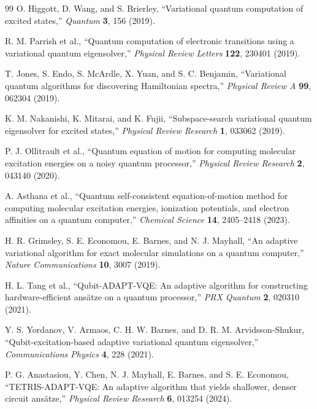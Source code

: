 \documentclass[
  reprint,
  amsmath,
  amssymb,
  aps,
  pra,
  nofootinbib,
  superscriptaddress,
  floatfix
]{revtex4-2}
\begin{document}
\begin{thebibliography}{99}
O. Higgott, D. Wang, and S. Brierley,
``Variational quantum computation of excited states,''
\emph{Quantum} \textbf{3}, 156 (2019).

R. M. Parrish et al.,
``Quantum computation of electronic transitions using a variational quantum eigensolver,''
\emph{Physical Review Letters} \textbf{122}, 230401 (2019).

T. Jones, S. Endo, S. McArdle, X. Yuan, and S. C. Benjamin,
``Variational quantum algorithms for discovering Hamiltonian spectra,''
\emph{Physical Review A} \textbf{99}, 062304 (2019).

K. M. Nakanishi, K. Mitarai, and K. Fujii,
``Subspace-search variational quantum eigensolver for excited states,''
\emph{Physical Review Research} \textbf{1}, 033062 (2019).

P. J. Ollitrault et al.,
``Quantum equation of motion for computing molecular excitation energies on a noisy quantum processor,''
\emph{Physical Review Research} \textbf{2}, 043140 (2020).

A. Asthana et al.,
``Quantum self-consistent equation-of-motion method for computing molecular excitation energies, ionization potentials, and electron affinities on a quantum computer,''
\emph{Chemical Science} \textbf{14}, 2405--2418 (2023).

H. R. Grimsley, S. E. Economou, E. Barnes, and N. J. Mayhall,
``An adaptive variational algorithm for exact molecular simulations on a quantum computer,''
\emph{Nature Communications} \textbf{10}, 3007 (2019).

H. L. Tang et al.,
``Qubit-ADAPT-VQE: An adaptive algorithm for constructing hardware-efficient ans\"atze on a quantum processor,''
\emph{PRX Quantum} \textbf{2}, 020310 (2021).

Y. S. Yordanov, V. Armaos, C. H. W. Barnes, and D. R. M. Arvidsson-Shukur,
``Qubit-excitation-based adaptive variational quantum eigensolver,''
\emph{Communications Physics} \textbf{4}, 228 (2021).

P. G. Anastasiou, Y. Chen, N. J. Mayhall, E. Barnes, and S. E. Economou,
``TETRIS-ADAPT-VQE: An adaptive algorithm that yields shallower, denser circuit ans\"atze,''
\emph{Physical Review Research} \textbf{6}, 013254 (2024).


\end{thebibliography}
\end{document}
